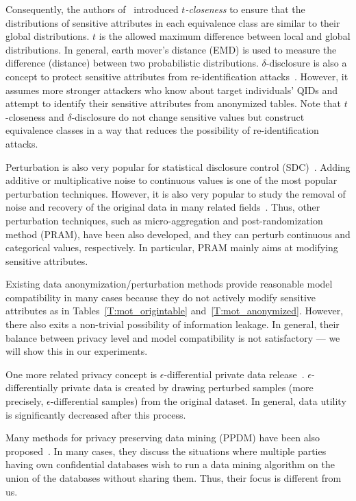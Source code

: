 Consequently, the authors of~\cite{li_t-closeness:_2007} introduced \textit{$t$-closeness} to ensure that the distributions of sensitive attributes in each equivalence class are similar to their global distributions. $t$ is the allowed maximum difference between local and global distributions. In general, earth mover's distance (EMD) is used to measure the difference (distance) between two probabilistic distributions. $\delta$-disclosure is also a concept to protect sensitive attributes from re-identification attacks~\cite{Brickell:2008:CPD:1401890.1401904}. However, it assumes more stronger attackers who know about target individuals' QIDs and attempt to identify their sensitive attributes from anonymized tables. Note that $t$-closeness and $\delta$-disclosure do not change sensitive values but construct equivalence classes in a way that reduces the possibility of re-identification attacks.

Perturbation is also very popular for statistical disclosure control (SDC)~\cite{series/ads/Domingo-Ferrer08}. Adding additive or multiplicative noise to continuous values is one of the most popular perturbation techniques. However, it is also very popular to study the removal of noise and recovery of the original data in many related fields~\cite{agrawal_design_2001}. Thus, other perturbation techniques, such as micro-aggregation and post-randomization method (PRAM), have been also developed, and they can perturb continuous and categorical values, respectively. In particular, PRAM mainly aims at modifying sensitive attributes.

Existing data anonymization/perturbation methods provide reasonable model compatibility in many cases because they do not actively modify sensitive attributes as in Tables~\ref{T:mot_origintable} and~\ref{T:mot_anonymized}. However, there also exits a non-trivial possibility of information leakage. In general, their balance between privacy level and model compatibility is not satisfactory --- we will show this in our experiments.

One more related privacy concept is $\epsilon$-differential private data release~\cite{Mohammed:2011:DPD:2020408.2020487}. $\epsilon$-differentially private data is created by drawing perturbed samples (more precisely, $\epsilon$-differential samples) from the original dataset. In general, data utility is significantly decreased after this process.

Many methods for privacy preserving data mining (PPDM) have been also proposed~\cite{Lindell:2000:PPD:646765.704129}. In many cases, they discuss the situations where multiple parties having own confidential databases wish to run a data mining algorithm on the union of the databases without sharing them. Thus, their focus is different from us.

